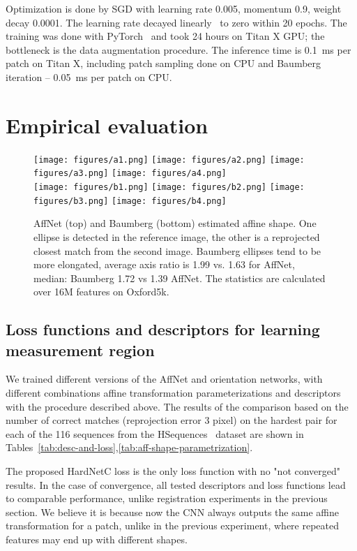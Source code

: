 \documentclass[runningheads]{llncs}
\begin{document}
Optimization is done by SGD with learning rate 0.005, momentum 0.9, weight decay 0.0001. The learning rate decayed linearly~\cite{Systematic2017} to zero within 20 epochs. The training was done with PyTorch~\cite{pytorch} and took 24 hours on Titan X GPU; the bottleneck is the data augmentation procedure. The inference time is 0.1~ms per patch on Titan X, including patch sampling done on CPU and Baumberg iteration -- 0.05~ms per patch on CPU.
\section{Empirical evaluation}\label{sec:exp}
\begin{figure}[tb]\centering
  \texttt{[image: figures/a1.png]}
   \texttt{[image: figures/a2.png]}
  \texttt{[image: figures/a3.png]}
   \texttt{[image: figures/a4.png]}\\
     \texttt{[image: figures/b1.png]}
   \texttt{[image: figures/b2.png]}
  \texttt{[image: figures/b3.png]}
   \texttt{[image: figures/b4.png]}\\
 \caption{ AffNet (top) and Baumberg (bottom) estimated affine shape. One ellipse is detected in the reference image, the other is a reprojected closest match from the second image. Baumberg ellipses tend to be more elongated, average axis ratio is 1.99 vs. 1.63 for AffNet, median: Baumberg 1.72 vs 1.39 AffNet. The statistics are calculated over 16M features on Oxford5k.}
 \label{fig:patch-examples}
\end{figure}\subsection{Loss functions and descriptors for learning measurement region}We trained different versions of the AffNet and orientation networks, with different combinations affine transformation parameterizations and descriptors with the procedure described above. 
The results of the comparison based on the number of correct matches (reprojection error  3 pixel) on the hardest pair for each of the 116 sequences from the HSequences~\cite{hpatches2017} dataset are shown in Tables~\ref{tab:desc-and-loss},\ref{tab:aff-shape-parametrization}.

The proposed HardNetC loss is the only loss function with no "not converged" results. In the case of convergence, all tested descriptors and loss functions lead to comparable performance, unlike registration experiments in the previous section. We believe it is because now the CNN always outputs the same affine transformation for a patch, unlike in the previous experiment, where repeated features may end up with different shapes.
\end{document}
